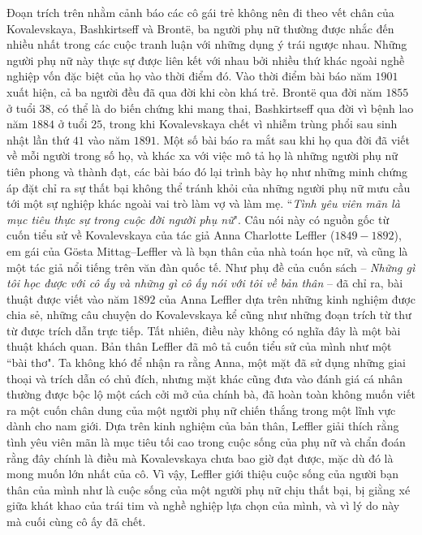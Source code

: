 \begin{multicols}{2}
	Đoạn trích trên nhằm cảnh báo các cô gái trẻ không nên đi theo vết chân của Kovalevskaya, Bashkirtseff và Brontë, ba người phụ nữ thường được nhắc đến nhiều nhất trong các cuộc tranh luận với những dụng ý trái ngược nhau.  Những người phụ nữ này thực sự được liên kết với nhau bởi nhiều thứ khác ngoài nghề nghiệp vốn đặc biệt của họ vào thời điểm đó. Vào thời điểm bài báo năm $1901$ xuất hiện, cả ba người đều đã qua đời khi còn khá trẻ. Brontë qua đời năm $1855$ ở tuổi $38$, có thể là do biến chứng khi mang thai, Bashkirtseff qua đời vì bệnh lao năm $1884$ ở tuổi $25$, trong khi Kovalevskaya chết vì nhiễm trùng phổi sau sinh nhật lần thứ $41$ vào năm $1891$. Một số bài báo ra mắt sau khi họ qua đời đã viết về mỗi người trong số họ, và khác xa với việc mô tả họ là những  người phụ nữ tiên phong và thành đạt, các bài báo đó lại trình bày họ như những minh chứng áp đặt chỉ ra sự thất bại không thể tránh khỏi của những người phụ nữ mưu cầu tới một sự nghiệp khác ngoài vai trò làm vợ và làm mẹ.
	\vskip 0.1cm
	``\textit{Tình yêu viên mãn là mục tiêu thực sự trong cuộc đời người phụ nữ}". Câu  nói này có nguồn gốc từ  cuốn tiểu sử về Kovalevskaya của tác giả Anna Charlotte Leffler ($1849-1892$),  em gái của Gösta Mittag--Leffler và là bạn thân của nhà toán học nữ, và cũng là một tác giả nổi tiếng trên văn đàn quốc tế. Như phụ đề của cuốn sách -- \textit{Những gì tôi học được với cô ấy và những gì cô ấy nói với tôi về bản thân} -- đã chỉ ra, bài thuật được viết vào năm $1892$ của Anna Leffler dựa trên những kinh nghiệm được chia sẻ, những câu chuyện do Kovalevskaya kể cũng như những đoạn trích từ thư từ được trích dẫn trực tiếp. Tất nhiên, điều này không có nghĩa đây là một bài thuật khách quan. Bản thân Leffler đã mô tả cuốn tiểu sử của mình như một ``bài thơ". Ta không khó để nhận ra rằng Anna, một mặt đã sử dụng những giai thoại và trích dẫn có chủ đích, nhưng mặt khác cũng đưa vào đánh giá cá nhân thường được bộc lộ một cách cởi mở của chính bà, đã hoàn toàn không muốn viết ra một cuốn chân dung của một người phụ nữ chiến thắng trong một lĩnh vực dành cho nam giới. Dựa trên kinh nghiệm của bản thân, Leffler giải thích rằng tình yêu viên mãn là mục tiêu tối cao trong cuộc sống của phụ nữ và chẩn đoán rằng đây chính là điều mà Kovalevskaya chưa bao giờ đạt được, mặc dù đó là mong muốn lớn nhất của cô. Vì vậy, Leffler giới thiệu cuộc sống của người bạn thân của mình như là cuộc sống của  một người phụ nữ chịu thất bại, bị giằng xé giữa khát khao của trái tim và nghề nghiệp lựa chọn của mình, và vì lý do này mà cuối cùng cô ấy đã chết.
	\vskip 0.1cm

\end{multicols}
